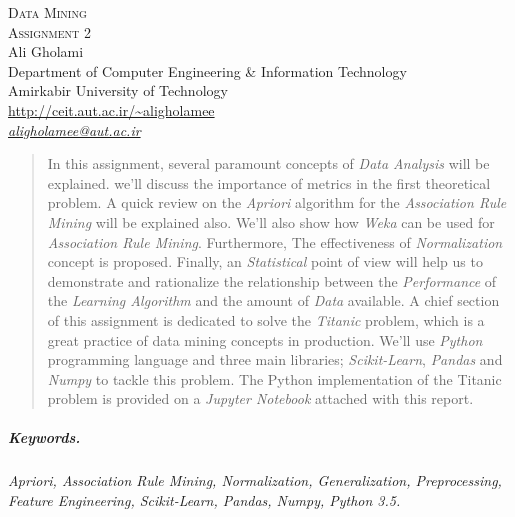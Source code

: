 \documentclass[12pt]{article}
\numberwithin{equation}{section}
\numberwithin{table}{section}
\numberwithin{figure}{section}
\begin{document}

\begin{center}
\textsc{\Large Data Mining} \\[2pt]
	\textsc{\large Assignment 2}\\
	\vspace{0.5cm}
  Ali Gholami \\[6pt]
  Department of Computer Engineering \& Information Technology\\
  Amirkabir University of Technology  \\[6pt]
  \def\UrlFont{\em}
  \url{http://ceit.aut.ac.ir/~aligholamee}\\
    \href{mailto:aligholamee@aut.ac.ir}{\textit{aligholamee@aut.ac.ir}}
\end{center}

\begin{abstract}
In this assignment, several paramount concepts of \textit{Data Analysis} will be explained. we'll discuss the importance of metrics in the first theoretical problem. A quick review on the \textit{Apriori} algorithm for the \textit{Association Rule Mining} will be explained also. We'll also show how \textit{Weka} can be used for \textit{Association Rule Mining}. Furthermore, The effectiveness of \textit{Normalization} concept is proposed. Finally, an \textit{Statistical} point of view will help us to demonstrate and rationalize the relationship between the \textit{Performance} of the \textit{Learning Algorithm} and the amount of \textit{Data} available. A chief section of this assignment is dedicated to solve the \textit{Titanic} problem, which is a great practice of data mining concepts in production. We'll use \textit{Python} programming language and three main libraries; \textit{Scikit-Learn}, \textit{Pandas} and \textit{Numpy} to tackle this problem. The Python implementation of the Titanic problem is provided on a \textit{Jupyter Notebook} attached with this report.
\end{abstract} 

\subparagraph{Keywords.} \textit{Apriori, Association Rule Mining, Normalization, Generalization, Preprocessing, Feature Engineering, Scikit-Learn, Pandas, Numpy, Python 3.5.}
\end{document}
